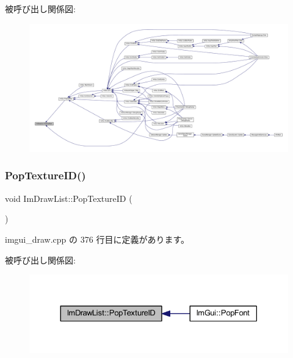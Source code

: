 被呼び出し関係図\+:
\nopagebreak
\begin{figure}[H]
\begin{center}
\leavevmode
\includegraphics[width=350pt]{struct_im_draw_list_a44f40c59ca755f559020f5a7fa81103a_icgraph}
\end{center}
\end{figure}
\mbox{\label{struct_im_draw_list_ade9286c5ca58753f7bd571b30e2ff76c}} 
\subsubsection{\texorpdfstring{Pop\+Texture\+I\+D()}{PopTextureID()}}
{\footnotesize\ttfamily void Im\+Draw\+List\+::\+Pop\+Texture\+ID (\begin{DoxyParamCaption}{ }\end{DoxyParamCaption})}



 imgui\+\_\+draw.\+cpp の 376 行目に定義があります。

被呼び出し関係図\+:\nopagebreak
\begin{figure}[H]
\begin{center}
\leavevmode
\includegraphics[width=330pt]{struct_im_draw_list_ade9286c5ca58753f7bd571b30e2ff76c_icgraph}
\end{center}
\end{figure}
\mbox{\label{struct_im_draw_list_a9df27414aaca5f34ac3664a8b82582b5}} 
